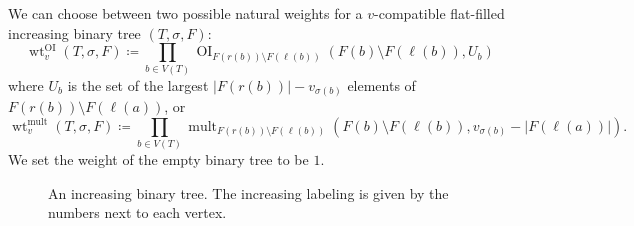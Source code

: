 \documentclass[ALCO,published]{cedram}
\numberwithin{equation}{section}
\numberwithin{figure}{section}
\DeclareMathOperator{\OI}{OI}
\DeclareMathOperator{\mult}{mult}
\DeclareMathOperator{\wt}{wt}
\begin{document}
We can choose between two possible natural weights for a $v$-compatible flat-filled increasing binary tree $(T,\sigma,F)$:
\[\wt^{\OI}_v(T,\sigma,F) \coloneqq \prod_{b\in V(T)} \OI_{F(r(b))\setminus F(\ell(b))} (F(b) \setminus F(\ell(b)), U_b)\]
where $U_b$ is the set of the largest $|F(r(b))| - v_{\sigma(b)}$ elements of $F(r(b)) \setminus F(\ell(a))$, or
\[\wt^{\mult}_v(T,\sigma,F) \coloneqq \prod_{b\in V(T)} \mult_{F(r(b))\setminus F(\ell(b))} (F(b) \setminus F(\ell(b)), v_{\sigma(b)}-|F(\ell(a))|).\]
We set the weight of the empty binary tree to be $1$.


\begin{figure}


\caption{An increasing binary tree. The increasing labeling is given by the numbers next to each vertex.}
\label{f:k=4 example}
\end{figure}
\end{document}
